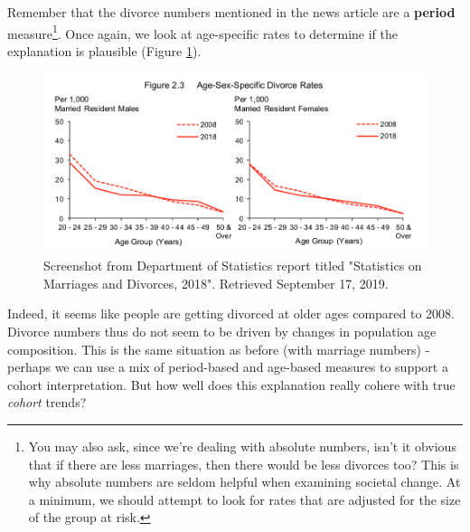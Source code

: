 \documentclass[openany]{book}
\let\rmarkdownfootnote\footnote%
\def\footnote{\protect\rmarkdownfootnote}
\begin{document}
Remember that the divorce numbers mentioned in the news article are a
\textbf{period} measure\footnote{You may also ask, since we're dealing
  with absolute numbers, isn't it obvious that if there are less
  marriages, then there would be less divorces too? This is why absolute
  numbers are seldom helpful when examining societal change. At a
  minimum, we should attempt to look for rates that are adjusted for the
  size of the group at risk.}. Once again, we look at age-specific rates
to determine if the explanation is plausible (Figure
\ref{fig:apc-reportsingstat2nd}).

\begin{figure}

{\centering \includegraphics[width=0.8\linewidth]{images/apc/report_fig3} 

}

\caption{Screenshot from Department of Statistics report titled "Statistics on Marriages and Divorces,  2018". Retrieved September 17, 2019.}\label{fig:apc-reportsingstat2nd}
\end{figure}

Indeed, it seems like people are getting divorced at older ages compared
to 2008. Divorce numbers thus do not seem to be driven by changes in
population age composition. This is the same situation as before (with
marriage numbers) - perhaps we can use a mix of period-based and
age-based measures to support a cohort interpretation. But how well does
this explanation really cohere with true \emph{cohort} trends?
\end{document}
